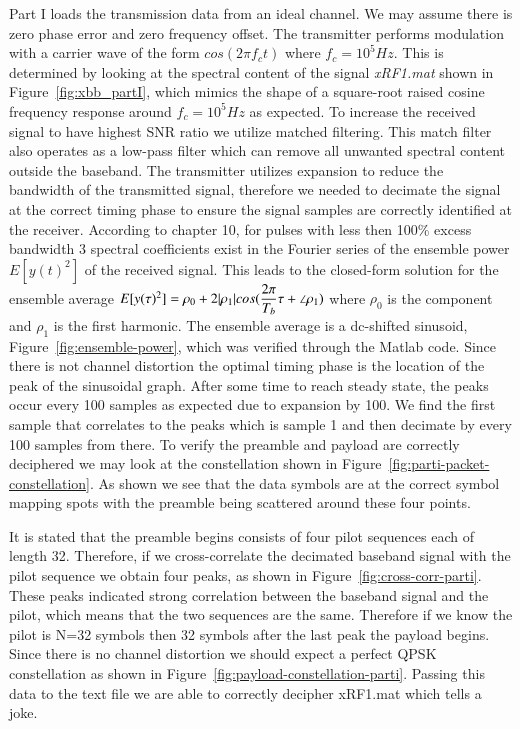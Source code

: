 Part I loads the transmission data from an ideal channel. We may assume there is zero phase error and zero frequency offset. The transmitter performs modulation with a carrier wave of the form $cos(2\pi f_c t)$ where $f_c = 10^5 Hz$. This is determined by looking at the spectral content of the signal \textit{xRF1.mat} shown in Figure~\ref{fig:xbb_partI}, which mimics the shape of a square-root raised cosine frequency response around $f_c = 10^5 Hz$ as expected. To increase the received signal to have highest SNR ratio we utilize matched filtering. This match filter also operates as a low-pass filter which can remove all unwanted spectral content outside the baseband. The transmitter utilizes expansion to reduce the bandwidth of the transmitted signal, therefore we needed to decimate the signal at the correct timing phase to ensure the signal samples are correctly identified at the receiver. According to chapter 10, for pulses with less then 100\% excess bandwidth 3 spectral coefficients exist in the Fourier series of the ensemble power $E[y(t)^2]$ of the received signal. This leads to the closed-form solution for the ensemble average $E[y(\tau)^2] = {\rho}_0 + 2\lvert{\rho}_1\rvert cos(\dfrac{2\pi}{T_b}\tau + \angle{{\rho}_1})$ where ${\rho}_0$ is the  component and ${\rho}_1$ is the first harmonic. The ensemble average is a dc-shifted sinusoid, Figure~\ref{fig:ensemble-power}, which was verified through the Matlab code. Since there is not channel distortion the optimal timing phase is the location of the peak of the sinusoidal graph. After some time to reach steady state, the peaks occur every 100 samples as expected due to expansion by 100. We find the first sample that correlates to the peaks which is sample 1 and then decimate by every 100 samples from there. To verify the preamble and payload are correctly deciphered we may look at the constellation shown in Figure~\ref{fig:parti-packet-constellation}. As shown we see that the data symbols are at the correct symbol mapping spots with the preamble being scattered around these four points.

It is stated that the preamble begins consists of four pilot sequences each of length 32. Therefore, if we cross-correlate the decimated baseband signal with the pilot sequence we obtain four peaks, as shown in Figure~\ref{fig:cross-corr-parti}. These peaks indicated strong correlation between the baseband signal and the pilot, which means that the two sequences are the same. Therefore if we know the pilot is N=32 symbols then 32 symbols after the last peak the payload begins. Since there is no channel distortion we should expect a perfect QPSK constellation as shown in Figure~\ref{fig:payload-constellation-parti}. Passing this data to the text file we are able to correctly decipher xRF1.mat which tells a joke.

